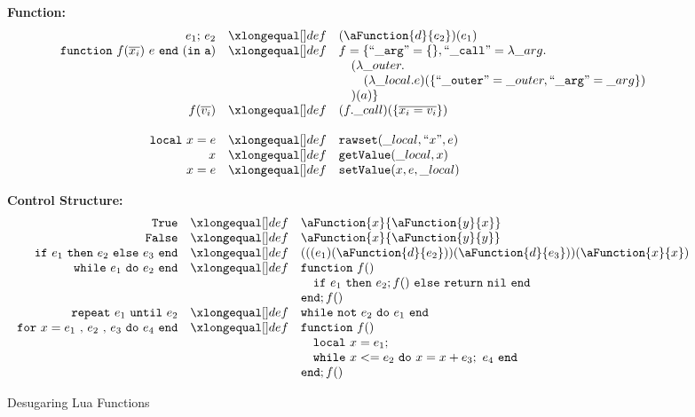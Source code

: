 \begin{figure}
\caption{Desugaring Lua Functions}\label{fig:desLuaFunc}
{\bf Function:}\[
\begin{array}{rclcl}
\desugar{e_1{\tt ;}~e_2}{(\aFunction{d}{e_2})(e_1)}
\desugar{{\tt function}~f(\overline{x_i})~e~{\tt end} ~({\tt in~a})}{f = \{ {\tt ``\_arg"} = \{\}, {\tt ``\_call"} = \lambda\_arg.}
\desugarline{
  \quad(\lambda\_outer.\\
  \quad\quad(\lambda\_local.e)(\{{\tt ``\_outer"} = \_outer, {\tt ``\_arg" }= \_arg\})\\
  \quad)(a)
\}
}
\desugar{f(\overline{v_i})}{(f.\_call)(\{\overline{x_i = v_i}\})}
\\
\desugar{{\tt local}~x=e}{{\tt rawset}(\_local, ``x", e)}
\desugar{x}{{\tt getValue}(\_local, x)}
\desugar{x=e}{{\tt setValue}(x, e, \_local)}

\end{array}\]


{\bf Control Structure:}\[
\begin{array}{rclcl}

\desugar{\tt True}{\aFunction{x}{\aFunction{y}{x}}}
\desugar{\tt False}{\aFunction{x}{\aFunction{y}{y}}}
\desugar{
    {\tt if}~e_1~{\tt then}~e_2~{\tt else}~e_3~{\tt end}
}{
    (((e_1)(\aFunction{d}{e_2}))(\aFunction{d}{e_3}))(\aFunction{x}{x})
}
\desugar{{\tt while}~e_1~{\tt do}~e_2~{\tt end}}{
    {\tt function}~f()
}
\desugarline{ \quad{\tt if}~e_1~{\tt then}~e_2;f()~{\tt else}~{\tt return}~{\tt nil}~{\tt end}\\
{\tt end};f()
}
\desugar{{\tt repeat}~e_1~{\tt until}~e_2}{
   {\tt while}~{\tt not}~e_2~{\tt do}~e_1~{\tt end}\\
}
\desugar{{\tt for}~x=e_1~{\tt ,}~e_2~{\tt ,}~e_3~{\tt do}~e_4~{\tt end}}{
    {\tt function}~f()
}
\desugarline{
    \quad {\tt local}~x = e_1;\\
    \quad {\tt while}~x<= e_2~{\tt do}~x = x + e_3;~e_4~{\tt end}\\
    {\tt end};f()\\
}
\end{array}\]
\end{figure}


